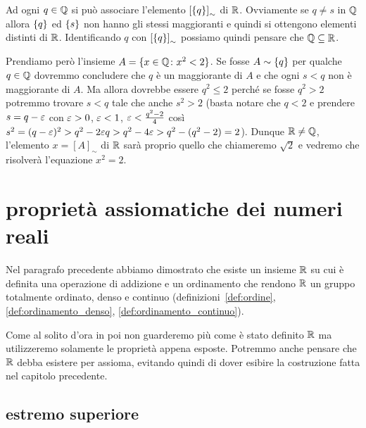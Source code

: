 Ad ogni $q\in {\mathbb Q}$ si può associare l'elemento ${\left[ {\left\{ q \right\}} \right]}_\sim$ 
di ${\mathbb R}$. Ovviamente se $q\neq s$ in ${\mathbb Q}$ allora ${\left\{ q \right\}}$ 
ed ${\left\{ s \right\}}$ non hanno gli stessi maggioranti e quindi si ottengono 
elementi distinti di ${\mathbb R}$. Identificando $q$ con ${\left[ {\left\{ q \right\}} \right]}_\sim$ 
possiamo quindi pensare che ${\mathbb Q} \subseteq {\mathbb R}$.

Prendiamo però l'insieme $A=\{x\in {\mathbb Q}\colon x^2<2\}$.
Se fosse $A\sim {\left\{ q \right\}}$ per qualche $q\in {\mathbb Q}$ dovremmo 
concludere che $q$ è un maggiorante di $A$ e che ogni $s<q$ 
non è maggiorante di $A$. 
Ma allora dovrebbe essere $q^2\le 2$ perché se fosse $q^2>2$
potremmo trovare $s<q$ tale che anche $s^2>2$ 
(basta notare che $q<2$ e prendere $s=q-\varepsilon$ con $\varepsilon>0$, $\varepsilon<1$, 
$\varepsilon<\frac{q^2-2}{4}$ così $s^2=(q-\varepsilon)^2 > q^2-2\varepsilon q > q^2-4\varepsilon
> q^2-(q^2-2) = 2$).
Dunque ${\mathbb R}\neq {\mathbb Q}$, l'elemento $x=[A]_\sim$ di ${\mathbb R}$ sarà 
proprio quello che chiameremo $\sqrt 2$ e vedremo che 
risolverà l'equazione $x^2=2$. 

\section{proprietà assiomatiche dei numeri reali}
\label{sec:reali}

Nel paragrafo precedente abbiamo dimostrato che esiste un insieme 
${\mathbb R}$ su cui è definita una operazione di addizione
e un ordinamento che rendono ${\mathbb R}$ un gruppo totalmente ordinato,
denso e continuo (definizioni~\ref{def:ordine}, \ref{def:ordinamento_denso},
\ref{def:ordinamento_continuo}). 

Come al solito d'ora in poi non guarderemo più come è stato definito ${\mathbb R}$ 
ma utilizzeremo solamente le proprietà appena esposte. 
Potremmo anche pensare che ${\mathbb R}$ debba esistere per assioma, 
evitando quindi di dover esibire la costruzione fatta nel capitolo precedente.


\subsection{estremo superiore}

